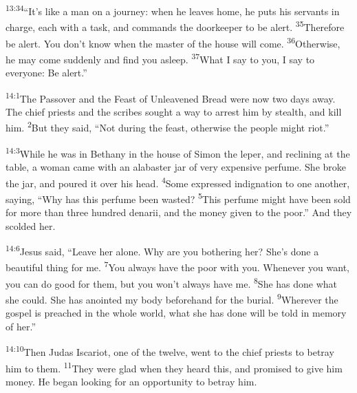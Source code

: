 \documentclass[openany,12pt,english]{book}
\newenvironment{para}{\par\pretolerance=100\tolerance=200\setlength{\emergencystretch}{0.6em}\relax}{\par}
\begin{document}
\begin{para}
    \textsuperscript{13:34}\thinspace{}“It's like a man on a jour\-ney: when he leaves home, he puts his servants in charge, each with a task, and commands the door\-keep\-er to be a\-lert.
    \textsuperscript{35}\thinspace{}There\-fore be a\-lert. You don't know when the mas\-ter of the house will come.
    \textsuperscript{36}\thinspace{}Oth\-er\-wise, he may come sud\-den\-ly and find you a\-sleep.
    \textsuperscript{37}\thinspace{}What I say to you, I say to eve\-ry\-one: Be a\-lert.”
\end{para}

\bigskip{}

\begin{para}
    \textsuperscript{14:1}\thinspace{}The Passover and the Feast of Un\-leav\-ened Bread were now two days a\-way. The chief priests and the scribes sought a way to ar\-rest him by stealth, and kill him.
    \textsuperscript{2}\thinspace{}But they said, “Not dur\-ing the feast, oth\-er\-wise the peo\-ple might ri\-ot.”
\end{para}

\begin{para}
    \textsuperscript{14:3}\thinspace{}While he was in Bethany in the house of Simon the lep\-er, and re\-clin\-ing at the ta\-ble, a wom\-an came with an al\-a\-bas\-ter jar of ver\-y ex\-pen\-sive per\-fume. She broke the jar, and poured it over his head.
    \textsuperscript{4}\thinspace{}Some expressed in\-dig\-na\-tion to one an\-oth\-er, say\-ing, “Why has this per\-fume been wast\-ed?
    \textsuperscript{5}\thinspace{}This per\-fume might have been sold for more than three hun\-dred de\-nar\-i\-i, and the mon\-ey giv\-en to the poor.” And they scolded her.
\end{para}

\begin{para}
    \textsuperscript{14:6}\thinspace{}Jesus said, “Leave her a\-lone. Why are you bothering her? She's done a beau\-ti\-ful thing for me.
    \textsuperscript{7}\thinspace{}You al\-ways have the poor with you. When\-ev\-er you want, you can do good for them, but you won't al\-ways have me.
    \textsuperscript{8}\thinspace{}She has done what she could. She has anointed my bod\-y be\-fore\-hand for the bur\-i\-al.
    \textsuperscript{9}\thinspace{}Wher\-ev\-er the gos\-pel is preached in the whole world, what she has done will be told in mem\-o\-ry of her.”
\end{para}

\begin{para}
    \textsuperscript{14:10}\thinspace{}Then Ju\-das Iscariot, one of the twelve, went to the chief priests to be\-tray him to them.
    \textsuperscript{11}\thinspace{}They were glad when they heard this, and prom\-ised to give him mon\-ey. He be\-gan looking for an op\-por\-tu\-ni\-ty to be\-tray him.
\end{para}
\end{document}
